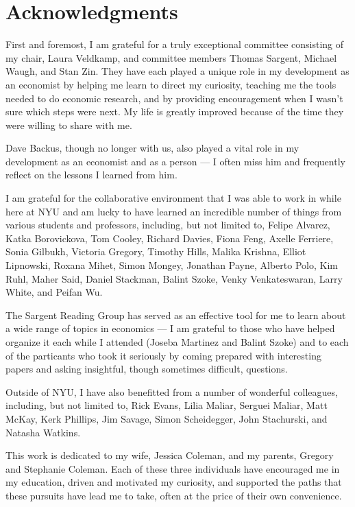 \documentclass[12pt,letterpaper,oneside,final]{memoir}
\begin{document}
\newpage

\chapter{Acknowledgments}

  First and foremost, I am grateful for a truly exceptional committee consisting of my chair, Laura
  Veldkamp, and committee members Thomas Sargent, Michael Waugh, and Stan Zin. They have each played
  a unique role in my development as an economist by helping me learn to direct my curiosity,
  teaching me the tools needed to do economic research, and by providing encouragement when I wasn't
  sure which steps were next. My life is greatly improved because of the time they were willing to
  share with me.

  Dave Backus, though no longer with us, also played a vital role in my development as an economist
  and as a person --- I often miss him and frequently reflect on the lessons I learned from him.

  I am grateful for the collaborative environment that I was able to work in while here at NYU and
  am lucky to have learned an incredible number of things from various students and professors,
  including, but not limited to, Felipe Alvarez, Katka Borovickova, Tom Cooley, Richard Davies,
  Fiona Feng, Axelle Ferriere, Sonia Gilbukh, Victoria Gregory, Timothy Hills, Malika Krishna,
  Elliot Lipnowski, Roxana Mihet, Simon Mongey, Jonathan Payne, Alberto Polo, Kim Ruhl, Maher Said,
  Daniel Stackman, Balint Szoke, Venky Venkateswaran, Larry White, and Peifan Wu.

  The Sargent Reading Group has served as an effective tool for me to learn about a wide range of
  topics in economics --- I am grateful to those who have helped organize it each while I attended
  (Joseba Martinez and Balint Szoke) and to each of the particants who took it seriously by coming
  prepared with interesting papers and asking insightful, though sometimes difficult, questions.

  Outside of NYU, I have also benefitted from a number of wonderful colleagues, including, but not
  limited to, Rick Evans, Lilia Maliar, Serguei Maliar, Matt McKay, Kerk Phillips, Jim Savage, Simon
  Scheidegger, John Stachurski, and Natasha Watkins.

  This work is dedicated to my wife, Jessica Coleman, and my parents, Gregory and Stephanie Coleman.
  Each of these three individuals have encouraged me in my education, driven and motivated my
  curiosity, and supported the paths that these pursuits have lead me to take, often at the price of
  their own convenience.
\end{document}
